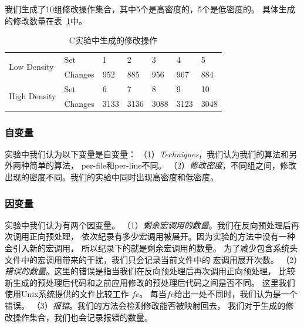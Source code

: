 我们生成了10组修改操作集合，其中5个是高密度的，5个是低密度的。
具体生成的修改数量在表~\ref{tbl:changes}中。
\begin{table}[htbp]
\caption{C实验中生成的修改操作}\label{tbl:changes}
\centering
\begin{tabular}{|l|l|lllll|}
  \hline
  \multirow{2}{2cm}{Low Density} & Set & 1 & 2 & 3 & 4 & 5  \\
  \cline{2-7}
                                 & Changes & 952 & 885 & 956 & 967 & 884 \\
  \hline
  \multirow{2}{2cm}{High Density} & Set & 6 & 7 & 8 & 9 & 10 \\
  \cline{2-7}
                                 & Changes & 3133 & 3136 & 3088 & 3123 & 3048\\
  \hline
\end{tabular}
\end{table}

\subsubsection{自变量}
实验中我们认为以下变量是自变量：
（1）\emph{Techniques}，我们认为我们的算法和另外两种简单的算法，
per-file和per-line不同。
（2）\emph{修改密度}，不同组之间，修改出现的密度不同。我们的实验中同时出现高密度和低密度。

\subsubsection{因变量}
实验中我们认为有两个因变量。
（1）\emph{剩余宏调用的数量}。我们在反向预处理后再次调用正向预处理，
  依次纪录有多少宏调用被展开。因为实验的方法中没有一种会引入新的宏调用，
  所以纪录下的就是剩余宏调用的数量。
  为了减少包含系统头文件中的宏调用带来的干扰，我们只会记录当前文件中的
  宏调用展开次数。
（2）\emph{错误的数量}。这里的错误是指当我们在反向预处理后再次调用正向预处理，
  比较新生成的预处理后代码和之前应用修改的预处理后代码之间是否不同。
  这里我们使用Unix系统提供的文件比较工作 $fc$。
  每当$fc$给出一处不同时，我们认为是一个错误。
（3）\emph{报错}。我们的方法会检测修改能否被映射回去，
我们对于生成的修改操作集合，我们也会记录报错的数量。


